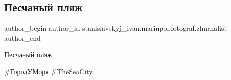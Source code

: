  
 
 
 
 

\subsection{Песчаный пляж}
\label{sec:16_03_2020.fb.stanislavskyj_ivan.mariupol.fotograf.zhurnalist.1.peschanii_plyazh}

\ifcmt
 author_begin
   author_id stanislavskyj_ivan.mariupol.fotograf.zhurnalist
 author_end
\fi

Песчаный пляж.

\#ГородУМоря \#TheSeaCity
